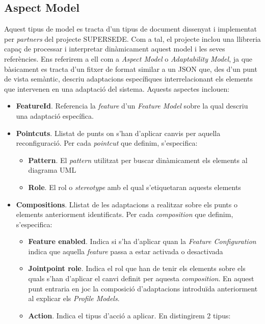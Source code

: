 \subsection{Aspect Model}

Aquest tipus de model es tracta d'un tipus de document dissenyat i implementat per \textit{partners} del projecte SUPERSEDE. Com a tal, el projecte inclou una llibreria capaç de processar i interpretar dinàmicament aquest model i les seves referències. Ens referirem a ell com a \textit{Aspect Model} o \textit{Adaptability Model}, ja que bàsicament es tracta d'un fitxer de format similar a un JSON que, des d'un punt de vista semàntic, descriu adaptacions específiques interrelacionant els elements que intervenen en una adaptació del sistema. Aquests aspectes inclouen:

\begin{itemize}
\item \textbf{FeatureId}. Referencia la \textit{feature} d'un \textit{Feature Model} sobre la qual descriu una adaptació específica.
\item \textbf{Pointcuts}. Llistat de punts on s'han d'aplicar canvis per aquella reconfiguració. Per cada \textit{pointcut} que definim, s'especifica:
\begin{itemize}
\item \textbf{Pattern}. El \textit{pattern} utilitzat per buscar dinàmicament els elements al diagrama UML
\item \textbf{Role}. El rol o \textit{stereotype} amb el qual s'etiquetaran aquests elements
\end{itemize} 
\item \textbf{Compositions}. Llistat de les adaptacions a realitzar sobre els punts o elements anteriorment identificats. Per cada \textit{composition} que definim, s'especifica:
\begin{itemize}
\item \textbf{Feature enabled}. Indica si s'ha d'aplicar quan la \textit{Feature Configuration} indica que aquella \textit{feature} passa a estar activada o desactivada
\item \textbf{Jointpoint role}. Indica el rol que han de tenir els elements sobre els quals s'han d'aplicar el canvi definit per aquesta \textit{composition}. En aquest punt entraria en joc la composició d'adaptacions introduïda anteriorment al explicar els \textit{Profile Models}.
\item \textbf{Action}. Indica el tipus d'acció a aplicar. En distingirem 2 tipus:
\begin{itemize}

\end{itemize}
\end{itemize}
\end{itemize}
